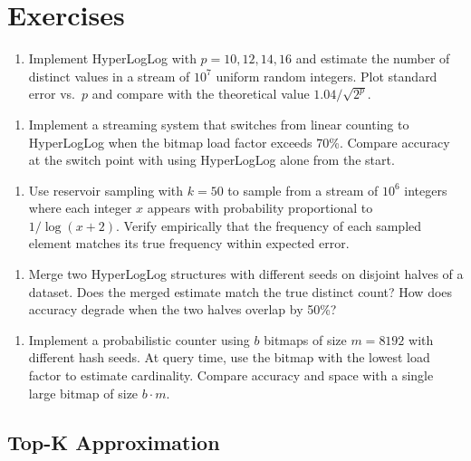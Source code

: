 \section{Exercises}

\begin{enumerate}
\item Implement HyperLogLog with $p = 10, 12, 14, 16$ and estimate the number of distinct values in a stream of $10^7$ uniform random integers. Plot standard error vs.\ $p$ and compare with the theoretical value $1.04 / \sqrt{2^p}$.
\end{enumerate}

\begin{enumerate}
\item Implement a streaming system that switches from linear counting to HyperLogLog when the bitmap load factor exceeds 70\%. Compare accuracy at the switch point with using HyperLogLog alone from the start.
\end{enumerate}

\begin{enumerate}
\item Use reservoir sampling with $k = 50$ to sample from a stream of $10^6$ integers where each integer $x$ appears with probability proportional to $1 / \log(x + 2)$. Verify empirically that the frequency of each sampled element matches its true frequency within expected error.
\end{enumerate}

\begin{enumerate}
\item Merge two HyperLogLog structures with different seeds on disjoint halves of a dataset. Does the merged estimate match the true distinct count? How does accuracy degrade when the two halves overlap by 50\%?
\end{enumerate}

\begin{enumerate}
\item Implement a probabilistic counter using $b$ bitmaps of size $m = 8192$ with different hash seeds. At query time, use the bitmap with the lowest load factor to estimate cardinality. Compare accuracy and space with a single large bitmap of size $b \cdot m$.
\end{enumerate}

\subsection{Top-K Approximation}

